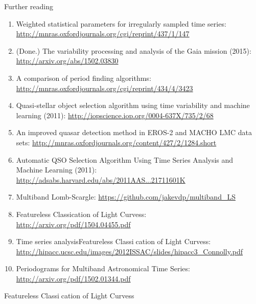 \huge{Further reading}

\normalsize

\begin{enumerate}

\item Weighted statistical parameters for irregularly sampled time series: \url{http://mnras.oxfordjournals.org/cgi/reprint/437/1/147}

\item (Done.) The variability processing and analysis of the Gaia mission (2015): \url{http://arxiv.org/abs/1502.03830}

\item A comparison of period finding algorithms: \url{http://mnras.oxfordjournals.org/cgi/reprint/434/4/3423}

\item Quasi-stellar object selection algorithm using time variability and machine learning (2011): \url{http://iopscience.iop.org/0004-637X/735/2/68}

\item An improved quasar detection method in EROS-2 and MACHO LMC data sets: \url{http://mnras.oxfordjournals.org/content/427/2/1284.short}

\item Automatic QSO Selection Algorithm Using Time Series Analysis and Machine Learning (2011): \url{http://adsabs.harvard.edu/abs/2011AAS...21711601K}

\item Multiband Lomb-Scargle: \url{https://github.com/jakevdp/multiband_LS}

\item Featureless Classication of Light Curvess: \url{http://arxiv.org/pdf/1504.04455.pdf}

\item Time series analysisFeatureless Classication of Light Curvess: \url{http://hipacc.ucsc.edu/images/2012ISSAC/slides/hipacc3_Connolly.pdf}

\item Periodograms for Multiband Astronomical Time Series: \url{http://arxiv.org/pdf/1502.01344.pdf}

\end{enumerate}Featureless Classication of Light Curvess
